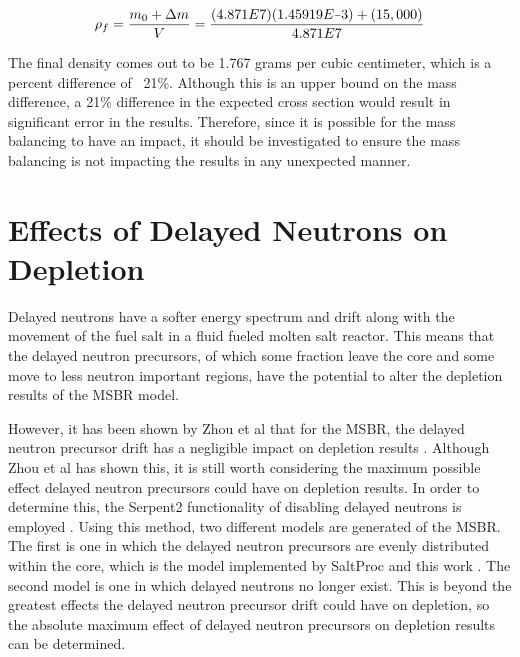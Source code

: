 \begin{equation} \hfill
\rho_f = \frac{m_0 + \Delta m}{V} = \frac{(4.871E7)(1.45919E\minus3) + (15,000)}{4.871E7} 
\hfill\label{eq:new_rho} \end{equation}

The final density comes out to be 1.767 grams per cubic centimeter, which is a percent difference of ~21\%. Although this is an upper bound on the mass difference, a 21\% difference in the expected cross section would result in significant error in the results. Therefore, since it is possible for the mass balancing to have an impact, it should be investigated to ensure the mass balancing is not impacting the results in any unexpected manner.









\section{Effects of Delayed Neutrons on Depletion}

Delayed neutrons have a softer energy spectrum and drift along with the movement of the fuel salt in a fluid fueled molten salt reactor. This means that the delayed neutron precursors, of which some fraction leave the core and some move to less neutron important regions, have the potential to alter the depletion results of the MSBR model.

However, it has been shown by Zhou et al that for the MSBR, the delayed neutron precursor drift has a negligible impact on depletion results \cite{zhou_fuel_2018}. Although Zhou et al has shown this, it is still worth considering the maximum possible effect delayed neutron precursors could have on depletion results. In order to determine this, the Serpent2 functionality of disabling delayed neutrons is employed \cite{leppanen_serpent_2015}. Using this method, two different models are generated of the MSBR. The first is one in which the delayed neutron precursors are evenly distributed within the core, which is the model implemented by SaltProc and this work \cite{rykhlevskii_modeling_2019}. The second model is one in which delayed neutrons no longer exist. This is beyond the greatest effects the delayed neutron precursor drift could have on depletion, so the absolute maximum effect of delayed neutron precursors on depletion results can be determined.

